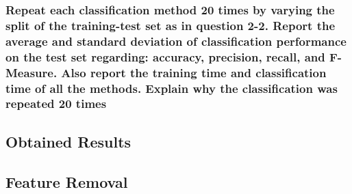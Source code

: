 \subsubsection{Repeat each classification method 20 times by varying the split of the training-test set as in question 2-2. Report the average and standard deviation of classification performance on the test set regarding: accuracy, precision, recall, and F- Measure. Also report the training time and classification time of all the methods. Explain why the classification was repeated 20 times}



\subsection{Obtained Results}



\subsection{Feature Removal}
